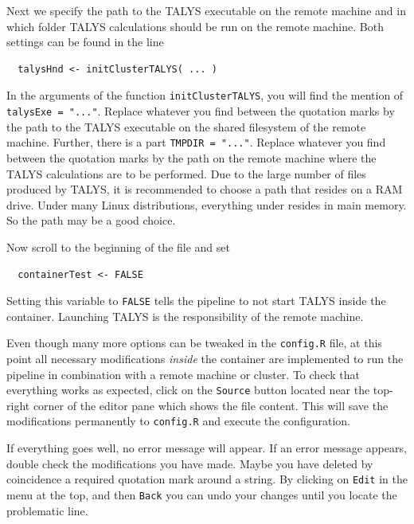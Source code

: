 \documentclass[12pt,a4paper]{scrartcl}
\begin{document}
Next we specify the path to the TALYS executable on the remote machine and in which folder TALYS calculations should be run on the remote machine.
Both settings can be found in the line
\begin{verbatim}
  talysHnd <- initClusterTALYS( ... )  
\end{verbatim}
In the arguments of the function \verb|initClusterTALYS|, you will find the mention of \verb|talysExe = "..."|.
Replace whatever you find between the quotation marks by the path to the TALYS executable on the shared filesystem of the remote machine.
Further, there is a part \verb|TMPDIR = "..."|. 
Replace whatever you find between the quotation marks by the path on the remote machine where the TALYS calculations are to be performed.
Due to the large number of files produced by TALYS, it is recommended to choose a path that resides on a RAM drive.
Under many Linux distributions, everything under  resides in main memory.
So the path  may be a good choice.

Now scroll to the beginning of the file and set
\begin{verbatim}
  containerTest <- FALSE
\end{verbatim}
Setting this variable to \verb|FALSE| tells the pipeline to not start TALYS inside the container.
Launching TALYS is the responsibility of the remote machine.

Even though many more options can be tweaked in the \verb|config.R| file, at this point all necessary modifications \textit{inside} the container are implemented to run the pipeline in combination with a remote machine or cluster.
To check that everything works as expected, click on the \verb|Source| button located near the top-right corner of the editor pane which shows the file content.
This will save the modifications permanently to \verb|config.R| and execute the configuration.

If everything goes well, no error message will appear.
If an error message appears, double check the modifications you have made.
Maybe you have deleted by coincidence a required quotation mark around a string.
By clicking on \verb|Edit| in the menu at the top, and then \verb|Back| you can undo your changes until you locate the problematic line.
\end{document}
